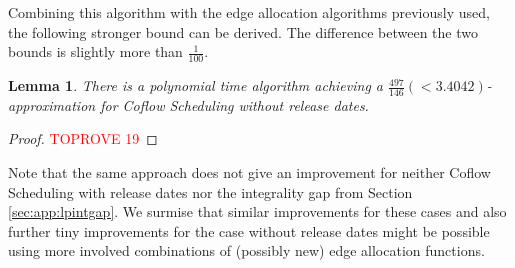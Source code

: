 \documentclass[11pt]{article}
\newtheorem{lemma}[theorem]{Lemma}
\begin{document}
Combining this algorithm with the edge allocation algorithms previously used, the following stronger bound can be derived. The difference between the two bounds is slightly more than $\frac{1}{100}$.

\begin{lemma}
There is a polynomial time algorithm achieving a $\frac{497}{146}(< 3.4042)$-approximation for Coflow Scheduling without release dates.
\end{lemma}
\begin{proof}\textcolor{red}{TOPROVE 19}\end{proof}

Note that the same approach does not give an improvement for neither Coflow Scheduling with release dates nor the integrality gap from Section \ref{sec:app:lpintgap}. We surmise that similar improvements for these cases and also further tiny improvements for the case without release dates might be possible using more involved combinations of (possibly new) edge allocation functions.
\end{document}
